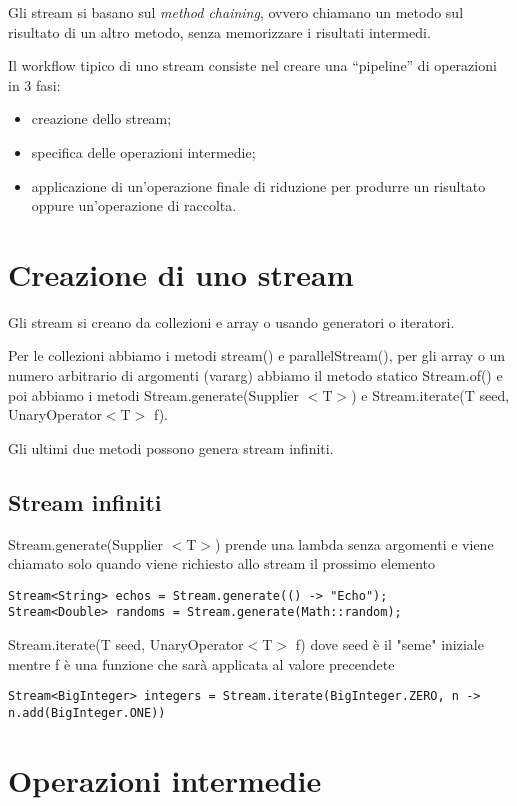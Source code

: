 Gli stream si basano sul \textit{method chaining}, ovvero chiamano un metodo sul risultato di un altro metodo, senza memorizzare i risultati intermedi.

Il workflow tipico di uno stream consiste nel creare una “pipeline” di operazioni in 3 fasi:
\begin{itemize}
    \item creazione dello stream;
    \item specifica delle operazioni intermedie;
    \item applicazione di un’operazione finale di riduzione per produrre un risultato oppure un'operazione di raccolta.
\end{itemize}

\section{Creazione di uno stream}

Gli stream si creano da collezioni e array o usando generatori o iteratori.

Per le collezioni abbiamo i metodi stream() e parallelStream(), per gli array o un numero arbitrario di argomenti (vararg) abbiamo il metodo statico\newline 
Stream.of() e poi abbiamo i metodi Stream.generate(Supplier $<$T$>$) e Stream.iterate(T seed, UnaryOperator$<$T$>$ f).

Gli ultimi due metodi possono genera stream infiniti.

\subsection{Stream infiniti}
Stream.generate(Supplier $<$T$>$) prende una lambda senza argomenti e viene chiamato solo quando viene richiesto allo stream il prossimo elemento
\begin{lstlisting}
Stream<String> echos = Stream.generate(() -> "Echo");
Stream<Double> randoms = Stream.generate(Math::random); 
\end{lstlisting}

Stream.iterate(T seed, UnaryOperator$<$T$>$ f) dove seed è il "seme" iniziale mentre f è una funzione che sarà applicata al valore precendete
\begin{lstlisting}
Stream<BigInteger> integers = Stream.iterate(BigInteger.ZERO, n -> n.add(BigInteger.ONE))   
\end{lstlisting}

\section{Operazioni intermedie}






